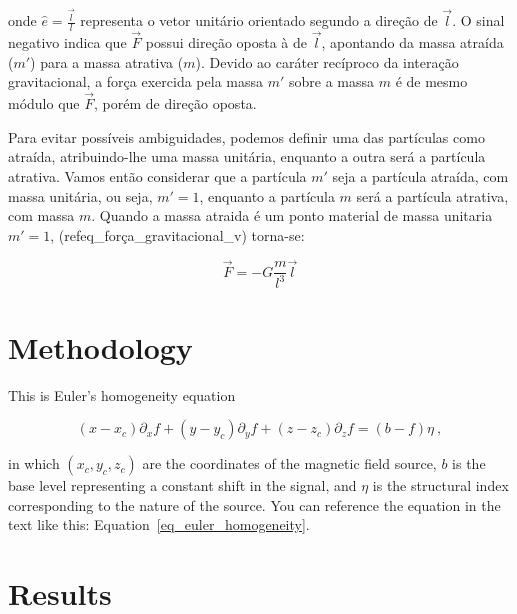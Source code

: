 \noindent
onde $\hat{e} = \frac{\vec{l}}{l}$ representa o vetor unitário orientado segundo a direção de $\vec{l}$. O sinal negativo indica 
que $\vec{F}$ possui direção oposta à de $\vec{l}$, apontando da massa atraída ($m'$) para a massa atrativa ($m$). Devido ao 
caráter recíproco da interação gravitacional, a força exercida pela massa $m'$ sobre a massa $m$ é de mesmo módulo que $\vec{F}$, 
porém de direção oposta.

Para evitar possíveis ambiguidades, podemos definir uma das partículas como atraída, atribuindo-lhe uma massa unitária, 
enquanto a outra será a partícula atrativa. Vamos então considerar que a partícula $m'$ seja a 
partícula atraída, com massa unitária, ou seja, $m' = 1$, enquanto a partícula $m$ será a partícula atrativa, com 
massa $m$. Quando a massa atraida é um ponto material de massa unitaria $m'=1$, (ref{eq_força_gravitacional_v}) torna-se:

\begin{equation}
  \label{eq_f_g_m_unitaria}
  \vec{F} = -G \dfrac{m}{l^3}\vec{l}
\end{equation}

\noindent



\lipsum[1-6]


\section{Methodology}

This is Euler's homogeneity equation

\begin{equation}
  \label{eq_euler_homogeneity}
  (x - x_c)\partial_x f + (y - y_c)\partial_y f + (z - z_c)\partial_z f
  = (b - f)\eta
  \ ,
\end{equation}

\noindent
in which $(x_c, y_c, z_c)$ are the coordinates of the magnetic field source,
$b$ is the base level representing a constant shift in the signal, and $\eta$
is the structural index corresponding to the nature of the source. You can
reference the equation in the text like this:
Equation~\ref{eq_euler_homogeneity}.

\lipsum[10-16]



\section{Results}


